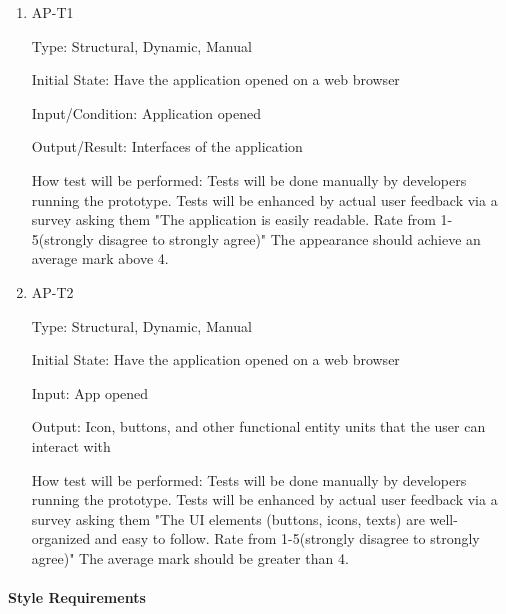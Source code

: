 \documentclass[12pt, titlepage]{article}
\begin{document}
\begin{enumerate}

\item{AP-T1\\}

Type: Structural, Dynamic, Manual
					
Initial State: Have the application opened on a web browser
					
Input/Condition: Application opened
					
Output/Result: Interfaces of the application
					
How test will be performed: Tests will be done manually by developers running the prototype. Tests will be enhanced by actual user feedback via a survey asking them "The application is easily readable. Rate from 1-5(strongly disagree to strongly agree)" The appearance should achieve an average mark above 4.
					
\item{AP-T2\\}

Type: Structural, Dynamic, Manual
					
Initial State: Have the application opened on a web browser
					
Input: App opened
					
Output: Icon, buttons, and other functional entity units that the user can interact with
					
How test will be performed: Tests will be done manually by developers running the prototype. Tests will be enhanced by actual user feedback via a survey asking them "The UI elements (buttons, icons, texts) are well-organized and easy to follow. Rate from 1-5(strongly disagree to strongly agree)" The average mark should be greater than 4.

\end{enumerate}

\paragraph{Style Requirements}
\end{document}
